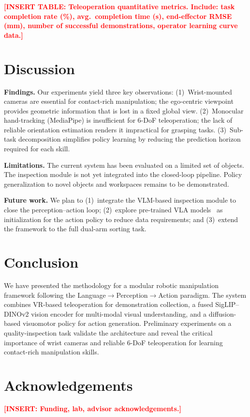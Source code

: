 \documentclass[conference]{IEEEtran}
\newcommand{\placeholder}[1]{\textcolor{red}{\textbf{[#1]}}}
\begin{document}
\placeholder{INSERT TABLE: Teleoperation quantitative metrics. Include: task completion rate (\%), avg.\ completion time (s), end-effector RMSE (mm), number of successful demonstrations, operator learning curve data.}

\section{Discussion}
\label{sec:discussion}

\textbf{Findings.} Our experiments yield three key observations: (1)~Wrist-mounted cameras are essential for contact-rich manipulation; the ego-centric viewpoint provides geometric information that is lost in a fixed global view. (2)~Monocular hand-tracking (MediaPipe) is insufficient for 6-DoF teleoperation; the lack of reliable orientation estimation renders it impractical for grasping tasks. (3)~Sub-task decomposition simplifies policy learning by reducing the prediction horizon required for each skill.

\textbf{Limitations.} The current system has been evaluated on a limited set of objects. The inspection module is not yet integrated into the closed-loop pipeline. Policy generalization to novel objects and workspaces remains to be demonstrated.

\textbf{Future work.} We plan to (1)~integrate the VLM-based inspection module to close the perception--action loop; (2)~explore pre-trained VLA models~\cite{kim2024openvla, black2024pi0} as initialization for the action policy to reduce data requirements; and (3)~extend the framework to the full dual-arm sorting task.

\section{Conclusion}
\label{sec:conclusion}

We have presented the methodology for a modular robotic manipulation framework following the Language$\to$Perception$\to$Action paradigm. The system combines VR-based teleoperation for demonstration collection, a fused SigLIP--DINOv2 vision encoder for multi-modal visual understanding, and a diffusion-based visuomotor policy for action generation. Preliminary experiments on a quality-inspection task validate the architecture and reveal the critical importance of wrist cameras and reliable 6-DoF teleoperation for learning contact-rich manipulation skills.

\section*{Acknowledgements}
\placeholder{INSERT: Funding, lab, advisor acknowledgements.}



\end{document}
